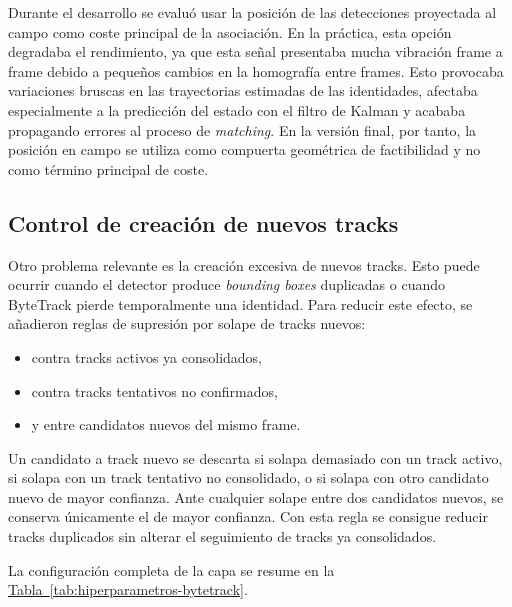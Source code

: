Durante el desarrollo se evaluó usar la posición de las detecciones proyectada al campo como coste principal de la asociación. En la práctica, esta opción degradaba el rendimiento, ya que esta señal presentaba mucha vibración frame a frame debido a pequeños cambios en la homografía entre frames. Esto provocaba variaciones bruscas en las trayectorias estimadas de las identidades, afectaba especialmente a la predicción del estado con el filtro de Kalman y acababa propagando errores al proceso de \textit{matching}. En la versión final, por tanto, la posición en campo se utiliza como compuerta geométrica de factibilidad y no como término principal de coste.

\subsection{Control de creación de nuevos tracks}

Otro problema relevante es la creación excesiva de nuevos tracks. Esto puede ocurrir cuando el detector produce \textit{bounding boxes} duplicadas o cuando ByteTrack pierde temporalmente una identidad. Para reducir este efecto, se añadieron reglas de supresión por solape de tracks nuevos:
\begin{itemize}
    \item contra tracks activos ya consolidados,
    \item contra tracks tentativos no confirmados,
    \item y entre candidatos nuevos del mismo frame.
\end{itemize}

Un candidato a track nuevo se descarta si solapa demasiado con un track activo, si solapa con un track tentativo no consolidado, o si solapa con otro candidato nuevo de mayor confianza. Ante cualquier solape entre dos candidatos nuevos, se conserva únicamente el de mayor confianza. Con esta regla se consigue reducir tracks duplicados sin alterar el seguimiento de tracks ya consolidados.

La configuración completa de la capa se resume en la \hyperref[tab:hiperparametros-bytetrack]{Tabla~\ref*{tab:hiperparametros-bytetrack}}.



